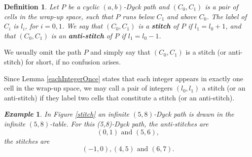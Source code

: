 \documentclass[a4paper,12pt]{article}
\newtheorem{defi}[thm]{Definition}
\newtheorem{exam}[thm]{\it Example}
\begin{document}
\begin{defi}%
Let $P$ be a cyclic $(a,b)$-Dyck path and $(C_0,C_1)$ is a pair of cells in the wrap-up space, such that  $P$ runs below $C_1$ and above $C_0$. The label of $C_i$ is $l_i$, for $i=0, 1$.
We say that  $(C_0,C_1)$ is a \textbf{{stitch}} of $P$ if $l_1=l_0+1$, and that    $(C_0,C_1)$ is an  \textbf{{anti-stitch}} of $P$ if $l_1=l_0-1$.
\end{defi}

We usually omit the path $P$ and simply say that $(C_0,C_1)$ is a stitch (or anti-stitch) for short, if no confusion arises.

Since Lemma \ref{eachIntegerOnce} states that each integer appears in exactly one cell in the wrap-up space, we may call a pair of integers $(l_0,l_1)$ a stitch (or an anti-stitch) if they label two cells that constitute a stitch (or an anti-stitch).

 \begin{exam}
   In Figure \ref{stitch} an infinite $(5,8)$-Dyck path is drawn in the infinite $(5,8)$-table. For this (5,8)-Dyck path,
    the anti-stitches are $$(0,1) \text{ and }(5,6),$$ the stitches are
        $$(-1,0),(4,5) \text{ and } (6,7).$$
  \end{exam}
\end{document}
